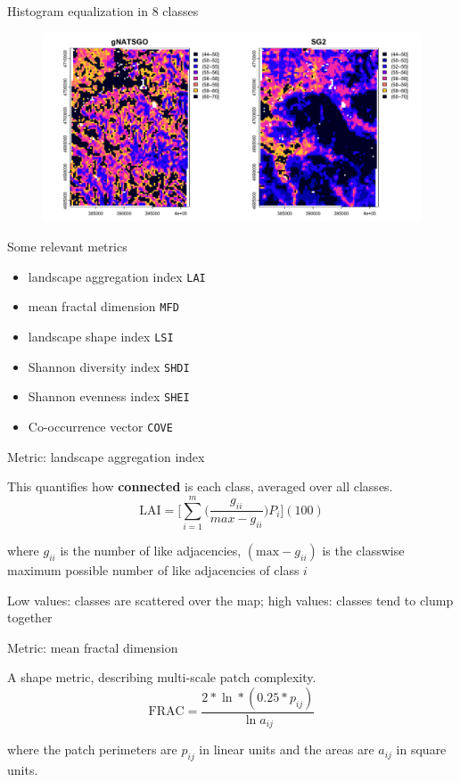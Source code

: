 \documentclass[aspectratio=169]{beamer}
\begin{document}
\begin{frame}{Histogram equalization in 8 classes}
    \begin{figure}
        \centering
\includegraphics[height=0.8\textheight]{graphics_david/show.classified-1.png}
    \end{figure}
\end{frame}

\begin{frame}{Some relevant metrics}
\begin{itemize}
    \item landscape aggregation index \texttt{LAI}
    \item mean fractal dimension \texttt{MFD}
    \item landscape shape index \texttt{LSI}
    \item Shannon diversity index \texttt{SHDI}
    \item Shannon evenness index \texttt{SHEI}
    \item Co-occurrence vector \texttt{COVE}
\end{itemize}    
\end{frame}

\begin{frame}{Metric: landscape aggregation index}

This quantifies how \textbf{connected} is each class, averaged over all classes.
    $$\mathrm{LAI} = \Bigg[∑_{i=1}^m \Big( \frac{g_{ii}}{max-g_{ii}} \Big) P_{i} \Bigg](100)$$
    
    where $g_{ii}$ is the number of like adjacencies, $(\mathrm{max}-g_{ii})$ is the classwise maximum possible number of like adjacencies of class $i$
\par
    Low values: classes are scattered over the map; high values: classes tend to clump together
\end{frame}

\begin{frame}{Metric: mean fractal dimension}

A shape metric, describing multi-scale patch complexity.
$$\mathrm{FRAC} = \frac{2 * \ln * (0.25 * p_{ij})} {\ln a_{ij}}$$ 

where the patch perimeters are ${p_{ij}}$ in linear units and the areas are ${a_{ij}}$ in square units.

\end{frame}
\end{document}
